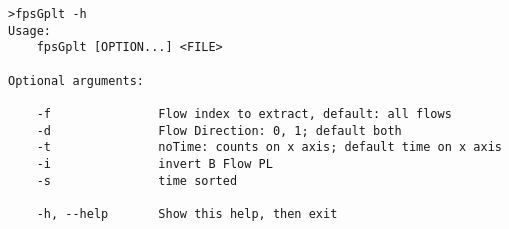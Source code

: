 \documentclass[documentation]{subfiles}
\begin{document}
\begin{verbatim}
>fpsGplt -h
Usage:
    fpsGplt [OPTION...] <FILE>

Optional arguments:

    -f               Flow index to extract, default: all flows
    -d               Flow Direction: 0, 1; default both
    -t               noTime: counts on x axis; default time on x axis
    -i               invert B Flow PL
    -s               time sorted

    -h, --help       Show this help, then exit
\end{verbatim}
\end{document}
